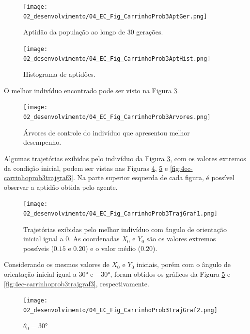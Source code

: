 
\begin{figure}[H]
	\centering
	\texttt{[image: 02\_desenvolvimento/04\_EC\_Fig\_CarrinhoProb3AptGer.png]}
	\caption{Aptidão da população ao longo de 30 gerações.}
	\label{fig:4ec-carrinhoprob3aptger}
\end{figure}

\begin{figure}[H]
	\centering
	\texttt{[image: 02\_desenvolvimento/04\_EC\_Fig\_CarrinhoProb3AptHist.png]}
	\caption{Histograma de aptidões.}
	\label{fig:4ec-carrinhoprob3apthist}
\end{figure}

O melhor indivíduo encontrado pode ser visto na Figura \ref{fig:4ec-carrinhoprob3arvores}.

\begin{figure}[H]
	\centering
	\texttt{[image: 02\_desenvolvimento/04\_EC\_Fig\_CarrinhoProb3Arvores.png]}
	\caption{Árvores de controle do indivíduo que apresentou melhor desempenho.}
	\label{fig:4ec-carrinhoprob3arvores}
\end{figure}

Algumas trajetórias exibidas pelo indivíduo da Figura \ref{fig:4ec-carrinhoprob3arvores}, com os valores extremos da condição inicial, podem ser vistas nas Figuras \ref{fig:4ec-carrinhoprob3trajgraf1}, \ref{fig:4ec-carrinhoprob3trajgraf2} e \ref{fig:4ec-carrinhoprob3trajgraf3}. Na parte superior esquerda de cada figura, é possível observar a aptidão obtida pelo agente.

\begin{figure}[H]
	\centering
	\texttt{[image: 02\_desenvolvimento/04\_EC\_Fig\_CarrinhoProb3TrajGraf1.png]}
	\caption{Trajetórias exibidas pelo melhor indivíduo com ângulo de orientação inicial igual a $0$. As coordenadas $X_0$ e $Y_0$ são os valores extremos possíveis ($0.15$ e $0.20$) e o valor médio ($0.20$).}
	\label{fig:4ec-carrinhoprob3trajgraf1}
\end{figure}

Considerando os mesmos valores de $X_0$ e $Y_0$ iniciais, porém com o ângulo de orientação inicial igual a $\ang{30}$ e $\ang{-30}$, foram obtidos os gráficos da Figura \ref{fig:4ec-carrinhoprob3trajgraf2} e \ref{fig:4ec-carrinhoprob3trajgraf3}, respectivamente.

\begin{figure}[H]
	\centering
	\texttt{[image: 02\_desenvolvimento/04\_EC\_Fig\_CarrinhoProb3TrajGraf2.png]}
	\caption{$\theta_0=\ang{30}$}
	\label{fig:4ec-carrinhoprob3trajgraf2}
\end{figure}

